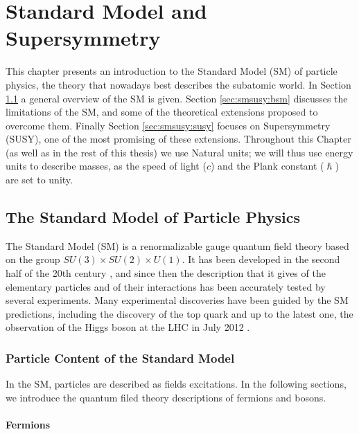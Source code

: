 \chapter{Standard Model and Supersymmetry}
\label{chap:SMSUSY}

\renewcommand{\arraystretch}{1.6}

This chapter presents an introduction to the Standard Model (SM) of particle physics, the theory that nowadays best describes the subatomic world. In Section \ref{sec:smsusy:sm} a general overview of the SM is given. Section \ref{sec:smsusy:bsm} discusses the limitations of the SM, and some of the theoretical extensions proposed to overcome them. Finally Section \ref{sec:smsusy:susy} focuses on Supersymmetry (SUSY), one of the most promising of these extensions. Throughout this Chapter (as well as in the rest of this thesis) we use Natural units; we will thus use energy units to describe masses, as the speed of light ($c$) and the Plank constant ($\hslash$) are set to unity.


\section{The Standard Model of Particle Physics}
\label{sec:smsusy:sm}

The Standard Model (SM) is a renormalizable gauge quantum field theory based on the group $SU(3) \times SU(2) \times U(1)$. It has been developed in the second half of the 20th century \cite{Glashow:1961tr}\cite{Weinberg:1967tq}\cite{Salam:1980jd}, and since then the description that it gives of the elementary particles and of their interactions has been accurately tested by several experiments. Many experimental discoveries have been guided by the SM predictions, including the discovery of the top quark \cite{Abachi:1994td}\cite{PhysRevLett.74.2626} and up to the latest one, the observation of the Higgs boson at the LHC in July 2012 \cite{Aad:2012tfa}\cite{Chatrchyan:2012xdj}. 

\subsection{Particle Content of the Standard Model}

In the SM, particles are described as fields excitations. In the following sections, we introduce the quantum filed theory descriptions of fermions and bosons.

\subsubsection{Fermions}


